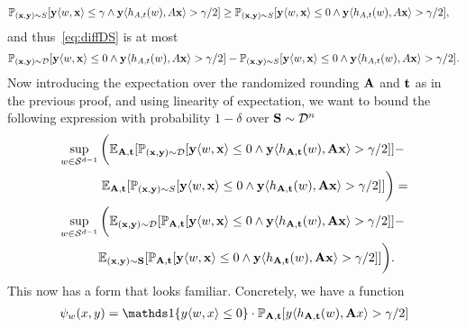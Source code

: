 \begin{align*}
    \mathbb{P}_{(\mathbf{x},\mathbf{y}) \sim S}[\mathbf{y} \langle w, \mathbf{x}\rangle \leq \gamma \wedge \mathbf{y} \langle h_{A,t}(w) , A\mathbf{x}\rangle > \gamma/2] &\geq 
    \mathbb{P}_{(\mathbf{x},\mathbf{y}) \sim S}[\mathbf{y} \langle w, \mathbf{x}\rangle \leq 0 \wedge \mathbf{y} \langle h_{A,t}(w) , A\mathbf{x}\rangle > \gamma/2],
\end{align*}
and thus~\eqref{eq:diffDS} is at most
\begin{align*}
\mathbb{P}_{(\mathbf{x},\mathbf{y}) \sim \mathcal{D}}[\mathbf{y} \langle w, \mathbf{x}\rangle \leq 0 \wedge \mathbf{y} \langle h_{A,t}(w) , A\mathbf{x}\rangle > \gamma/2] - \mathbb{P}_{(\mathbf{x},\mathbf{y}) \sim S}[\mathbf{y} \langle w, \mathbf{x}\rangle \leq 0 \wedge \mathbf{y} \langle h_{A,t}(w) , A\mathbf{x}\rangle > \gamma/2].
\end{align*}
Now introducing the expectation over the randomized rounding $\mathbf{A}$ and $\mathbf{t}$ as in the previous proof, and using linearity of expectation, we want to bound the following expression with probability $1-\delta$ over $\mathbf{S} \sim \mathcal{D}^n$
\begin{align}
    \sup_{w \in \mathcal{S}^{d-1}} \bigg(\mathbb{E}_{\mathbf{A},\mathbf{t}}[\mathbb{P}_{(\mathbf{x},\mathbf{y}) \sim \mathcal{D}}[\mathbf{y} \langle w, \mathbf{x}\rangle \leq 0 \wedge \mathbf{y} \langle h_{\mathbf{A},\mathbf{t}}(w) , \mathbf{A}\mathbf{x}\rangle > \gamma/2]] 
    &-\nonumber\\ \mathbb{E}_{\mathbf{A},\mathbf{t}}[\mathbb{P}_{(\mathbf{x},\mathbf{y}) \sim S}[\mathbf{y} \langle w, \mathbf{x}\rangle \leq 0 \wedge \mathbf{y} \langle h_{\mathbf{A},\mathbf{t}}(w) , \mathbf{A}\mathbf{x}\rangle > \gamma/2]]\bigg) &= \nonumber\\
    \sup_{w \in \mathcal{S}^{d-1}} \bigg(\mathbb{E}_{(\mathbf{x},\mathbf{y}) \sim \mathcal{D}}[\mathbb{P}_{\mathbf{A},\mathbf{t}}[\mathbf{y} \langle w, \mathbf{x}\rangle \leq 0 \wedge \mathbf{y} \langle h_{\mathbf{A},\mathbf{t}}(w) , \mathbf{A}\mathbf{x}\rangle > \gamma/2]] 
    &-\nonumber\\ \mathbb{E}_{(\mathbf{x},\mathbf{y}) \sim \mathbf{S}}[\mathbb{P}_{\mathbf{A},\mathbf{t}}[\mathbf{y} \langle w, \mathbf{x}\rangle \leq 0 \wedge \mathbf{y} \langle h_{\mathbf{A},\mathbf{t}}(w) , \mathbf{A}\mathbf{x}\rangle > \gamma/2]]\bigg). \label{eq:needRad}
\end{align}
This now has a form that looks familiar. Concretely, we have a function 
\begin{align}
\psi_w(x,y) = \indi{ y\langle w ,x \rangle \leq 0} \cdot \Pr_{\rA,\rt}[y \langle h_{\rA,\rt}(w),\rA x\rangle > \gamma/2] \label{eq:psi}
\end{align}
